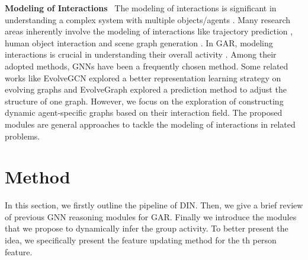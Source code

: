 \documentclass[10pt,twocolumn,letterpaper]{article}
\begin{document}
\textbf{Modeling of Interactions} \ The modeling of interactions is significant in understanding a complex system with multiple objects/agents \cite{battaglia2016interactionnetwork,chang2016learningphysicaldynamics}. Many research areas inherently involve the modeling of interactions like trajectory prediction \cite{gupta2018socialgan,sun2019stochasticprediction,sadeghian2019sophie}, human object interaction \cite{qi2018hoibygpnn,li2019transferable,gao2020drg} and scene graph generation \cite{xu2017iterativemessage,zellers2018neuralmotif,chen2019kern}. In GAR, modeling interactions is crucial in understanding their overall activity \cite{bagautdinov2017social}. Among their adopted methods, GNNs have been a frequently chosen method. Some related works like EvolveGCN \cite{pareja2020evolvegcn} explored a better representation learning strategy on evolving graphs and EvolveGraph \cite{li2020evolvegraph} explored a prediction method to adjust the structure of one graph. However, we focus on the exploration of constructing dynamic agent-specific graphs based on their interaction field. The proposed modules are general approaches to tackle the modeling of interactions in related problems.












\section{Method}
In this section, we firstly outline the pipeline of DIN. Then, we give a brief review of previous GNN reasoning modules for GAR. Finally we introduce the modules that we propose to dynamically infer the group activity. To better present the idea, we specifically present the feature updating method for the th person feature.
\end{document}
